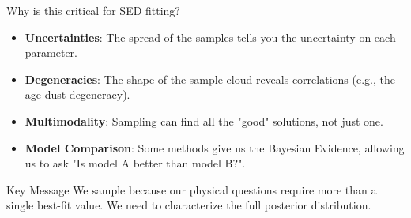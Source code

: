 \documentclass[aspectratio=169]{beamer}
\newcommand{\keyterm}[1]{\textbf{\textcolor{blue!70!black}{#1}}}
\begin{document}
\begin{frame}
    \begin{block}{Why is this critical for SED fitting?}
        \begin{itemize}
            \item \keyterm{Uncertainties}: The spread of the samples tells you the uncertainty on each parameter.
            \item \keyterm{Degeneracies}: The shape of the sample cloud reveals correlations (e.g., the age-dust degeneracy).
            \item \keyterm{Multimodality}: Sampling can find all the "good" solutions, not just one.
            \item \keyterm{Model Comparison}: Some methods give us the Bayesian Evidence, allowing us to ask "Is model A better than model B?".
        \end{itemize}
    \end{block}
    
    \begin{alertblock}{Key Message}
        We sample because our physical questions require more than a single best-fit value. We need to characterize the full posterior distribution.
    \end{alertblock}
\end{frame}
\end{document}
